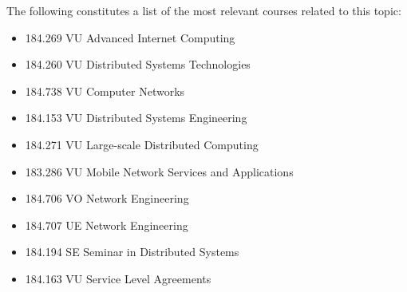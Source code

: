 \documentclass[a4paper]{article}
\begin{document}
The following constitutes a list of the most relevant courses related to this topic:


\begin{itemize}

\item{184.269 VU Advanced Internet Computing}
\item{184.260 VU Distributed Systems Technologies}
\item{184.738 VU Computer Networks}
\item{184.153 VU Distributed Systems Engineering}
\item{184.271 VU Large-scale Distributed Computing}
\item{183.286 VU Mobile Network Services and Applications}
\item{184.706 VO Network Engineering}
\item{184.707 UE Network Engineering}
\item{184.194 SE Seminar in Distributed Systems}
\item{184.163 VU Service Level Agreements }

\end{itemize}

\printbibliography
\end{document}
